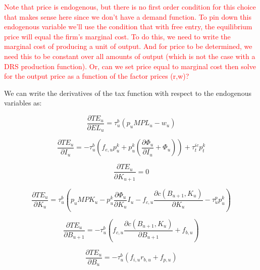 \textcolor{red}{Note that price is endogenous, but there is no first order condition for this choice that makes sense here since we don't have a demand function.  To pin down this endogenous variable we'll use the condition that with free entry, the equilibrium price will equal the firm's marginal cost. To do this, we need to write the marginal cost of producing a unit of output.  And for price to be determined, we need this to be constant over all amounts of output (which is not the case with a DRS production function).  Or, can we set price equal to marginal cost then solve for the output price as a function of the factor prices (r,w)? }

We can write the derivatives of the tax function with respect to the endogenous variables as:

\begin{equation}
\label{eqn:d_te_l}
\frac{\partial TE_{u}}{\partial EL_{u}}= \tau^{b}_{u}\left(p_{u}MPL_{u}- w_{u} \right)
\end{equation}

\begin{equation}
\label{eqn:d_te_i}
\frac{\partial TE_{u}}{\partial I_{u}}= -\tau^{b}_{u}\left(f_{e,u}p^{k}_{u} + p^{k}_{u}\left(\frac{\partial \Phi_{u}}{\partial I_{u}} + \Phi_{u}\right)\right) + \tau^{ic}_{t}p^{k}_{t}
\end{equation}

\begin{equation}
\label{eqn:d_te_kp1}
\frac{\partial TE_{u}}{\partial K_{u+1}}= 0
\end{equation}

\begin{equation}
\label{eqn:d_te_k}
\frac{\partial TE_{u}}{\partial K_{u}}= \tau^{b}_{u}\left( p_{u}MPK_{u} - p^{k}_{u}\frac{\partial \Phi_{u}}{\partial K_{u}}I_{u} - f_{c,u}\frac{\partial c(B_{u+1},K_{u})}{\partial K_{u}}- \tau^{p}_{u}p^{k}_{u}\right)
\end{equation}

\begin{equation}
\label{eqn:d_te_bp1}
\frac{\partial TE_{u}}{\partial B_{u+1}}= -\tau^{b}_{u}\left( f_{c,u}\frac{\partial c(B_{u+1},K_{u})}{\partial B_{u+1}} + f_{b,u}\right)
\end{equation}

\begin{equation}
\label{eqn:d_te_b}
\frac{\partial TE_{u}}{\partial B_{u}}= -\tau^{b}_{u}\left(f_{i,u}r_{b,u} + f_{p,u} \right)
\end{equation}

